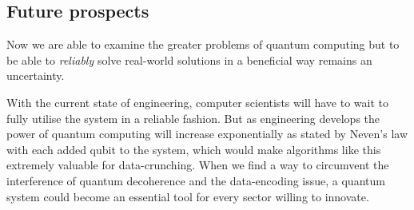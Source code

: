 \subsection{Future prospects}

Now we are able to examine the greater problems of quantum computing but to be able to \textit{reliably} solve real-world solutions in a beneficial way remains an uncertainty.

With the current state of engineering, computer scientists will have to wait to fully utilise the system in a reliable fashion. But as engineering develops the power of quantum computing will increase exponentially as stated by Neven's law \autocite{Hartnett2019} with each added qubit to the system, which would make algorithms like this extremely valuable for data-crunching. When we find a way to circumvent the interference of quantum decoherence and the data-encoding issue, a quantum system could become an essential tool for every sector willing to innovate. 


